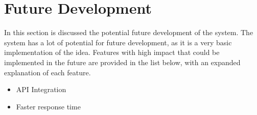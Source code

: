\section{Future Development}\label{sec:future-development}

In this section is discussed the potential future development of the system.
The system has a lot of potential for future development, as it is a very basic implementation of the idea.
Features with high impact that could be implemented in the future are provided in the list below, with an expanded
explanation of each feature.

\begin{itemize}
    \item API Integration

    \item Faster response time
\end{itemize}



